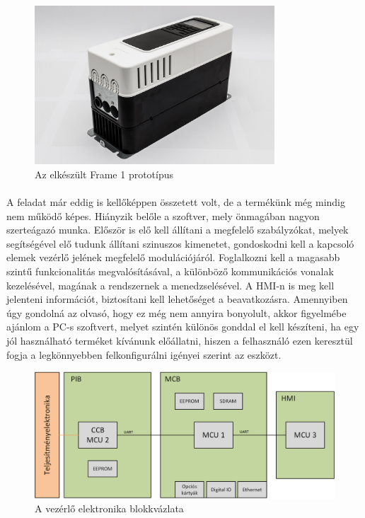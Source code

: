 \begin{figure}[H]
	\centering
	\includegraphics[width = 0.8\textwidth]{figures/n700_proto.jpg}
	\caption{Az elkészült Frame 1 prototípus} 
	\label{fig:n700_proto}
\end{figure}

\paragraph{}
A feladat már eddig is kellőképpen összetett volt, de a termékünk még mindig nem működő képes. Hiányzik belőle a szoftver, mely önmagában nagyon szerteágazó munka. Először is elő kell állítani a megfelelő szabályzókat, melyek segítségével elő tudunk állítani szinuszos kimenetet, gondoskodni kell a kapcsoló elemek vezérlő jelének megfelelő modulációjáról. Foglalkozni kell a magasabb szintű funkcionalitás megvalósításával, a különböző kommunikációs vonalak kezelésével, magának a rendszernek a menedzselésével. A HMI-n is meg kell jelenteni információt, biztosítani kell lehetőséget a beavatkozásra. Amennyiben úgy gondolná az olvasó, hogy ez még nem annyira bonyolult, akkor figyelmébe ajánlom a PC-s szoftvert, melyet szintén különös gonddal el kell készíteni, ha egy jól használható terméket kívánunk előállatni, hiszen a felhasználó ezen keresztül fogja a legkönnyebben felkonfigurálni igényei szerint az eszközt.


\begin{figure}[h!]
	\centering
	\includegraphics[width = \textwidth]{figures/architect_2.png}
	\caption{A vezérlő elektronika blokkvázlata} 
	\label{fig:hw_architect}
\end{figure}

